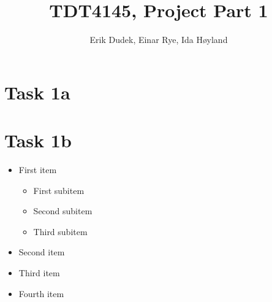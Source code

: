 \documentclass[a4paper,12pt]{article}
\begin{document}
\title{TDT4145, Project Part 1}
\author{Erik Dudek, Einar Rye, Ida Høyland}
\maketitle
\section{Task 1a}
\section{Task 1b}

\begin{itemize}
\item First item
\begin{itemize}
\item First subitem
\item Second subitem
\item Third subitem
\end{itemize}
\item Second item
\item Third item
\item Fourth item
\end{itemize}

\end{document}
